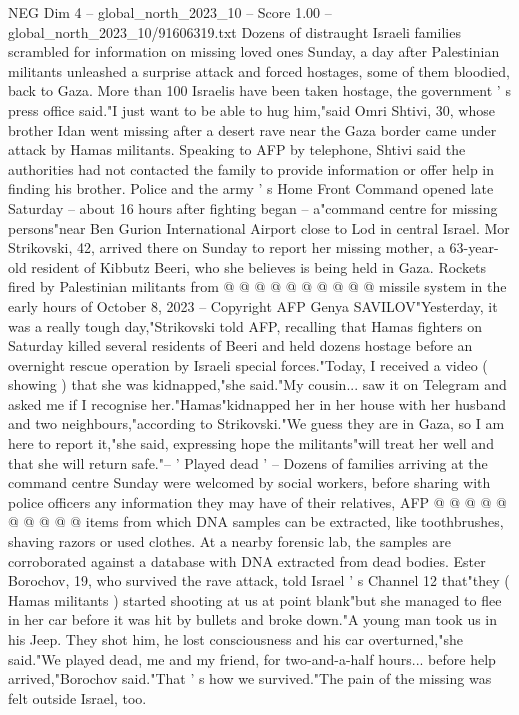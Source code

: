 \begin{textsample}{NEG Dim 4 – global\_north\_2023\_10 – Score 1.00 – global\_north\_2023\_10/91606319.txt}  \label{ex:f4_neg_002}
Dozens of distraught Israeli families scrambled for information on missing loved ones Sunday, a day after Palestinian militants unleashed a surprise attack and forced hostages, some of them bloodied, back to Gaza.
More than 100 Israelis have been taken hostage, the government ' s press office said."I just want to be able to hug him,"said Omri Shtivi, 30, whose brother Idan went missing after a desert rave near the Gaza border came under attack by Hamas militants.
Speaking to AFP by telephone, Shtivi said the authorities had not contacted the family to provide information or offer help in finding his brother.
Police and the army ' s Home Front Command opened late Saturday -- about 16 hours after fighting began -- a"command centre for missing persons"near Ben Gurion International Airport close to Lod in central Israel.
Mor Strikovski, 42, arrived there on Sunday to report her missing mother, a 63-year-old resident of Kibbutz Beeri, who she believes is being held in Gaza.
Rockets fired by Palestinian militants from @ @ @ @ @ @ @ @ @ @ missile system in the early hours of October 8, 2023 -- Copyright AFP Genya SAVILOV"Yesterday, it was a really tough day,"Strikovski told AFP, recalling that Hamas fighters on Saturday killed several residents of Beeri and held dozens hostage before an overnight rescue operation by Israeli special forces."Today, I received a video ( showing ) that she was kidnapped,"she said."My cousin... saw it on Telegram and asked me if I recognise her."Hamas"kidnapped her in her house with her husband and two neighbours,"according to Strikovski."We guess they are in Gaza, so I am here to report it,"she said, expressing hope the militants"will treat her well and that she will return safe."-- ' Played dead ' -- Dozens of families arriving at the command centre Sunday were welcomed by social workers, before sharing with police officers any information they may have of their relatives, AFP @ @ @ @ @ @ @ @ @ @ items from which DNA samples can be extracted, like toothbrushes, shaving razors or used clothes.
At a nearby forensic lab, the samples are corroborated against a database with DNA extracted from dead bodies.
Ester Borochov, 19, who survived the rave attack, told Israel ' s Channel 12 that"they ( Hamas militants ) started shooting at us at point blank"but she managed to flee in her car before it was hit by bullets and broke down."A young man took us in his Jeep.
They shot him, he lost consciousness and his car overturned,"she said."We played dead, me and my friend, for two-and-a-half hours... before help arrived,"Borochov said."That ' s how we survived."The pain of the missing was felt outside Israel, too.

\end{textsample}
